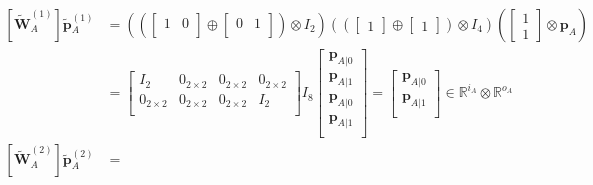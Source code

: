 \documentclass[10pt, a4paper]{article}
\numberwithin{equation}{section} %
\theoremstyle{definition}
\theoremstyle{plain}
\newcommand{\?}{\mathrel{?}} %
\newcommand{\R}{\mathbb{R}} %
\newcommand{\cvec}[1]{\boldsymbol{\mathbf{#1}}}    %
\newcommand{\matr}[2][]{\left[\mathbf{#2}#1\right]} %
\begin{document}
                \begin{align*}
                  \matr[_A^{(1)}]{\tilde{W}} \cvec{\tilde{p}}{_A^{(1)}} &= \left( \left(
                      \begin{bmatrix} 1 & 0 \\ \end{bmatrix} 
                  \oplus \begin{bmatrix} 0 & 1 \\ \end{bmatrix} \right) \otimes I_2 \right)
                  \left( \left( \begin{bmatrix} 1 \end{bmatrix} \oplus \begin{bmatrix} 1 \end{bmatrix} \right) \otimes I_{4} \right) 
                  \left( \begin{bmatrix} 1 \\ 1 \end{bmatrix} \otimes \cvec{p}_A \right) \\
                                           &= \begin{bmatrix}
                                             I_2 & 0_{2\times 2} & 0_{2\times 2} & 0_{2\times 2} \\
                                             0_{2\times 2} & 0_{2\times 2} & 0_{2\times 2} & I_2 \\
                                             \end{bmatrix} I_{8} \begin{bmatrix}
                                             \cvec{p}_{A|0} \\
                                             \cvec{p}_{A|1} \\
                                             \cvec{p}_{A|0} \\
                                             \cvec{p}_{A|1} \\
                                             \end{bmatrix} = \begin{bmatrix}
                                             \cvec{p}_{A|0} \\
                                             \cvec{p}_{A|1} \\
                                           \end{bmatrix} \in \R^{i_A} \otimes \R^{o_A} \\
                  \matr[_A^{(2)}]{\tilde{W}} \cvec{\tilde{p}}{_A^{(2)}} &= \begin{gathered}

\end{gathered}
\end{align*}
\end{document}
